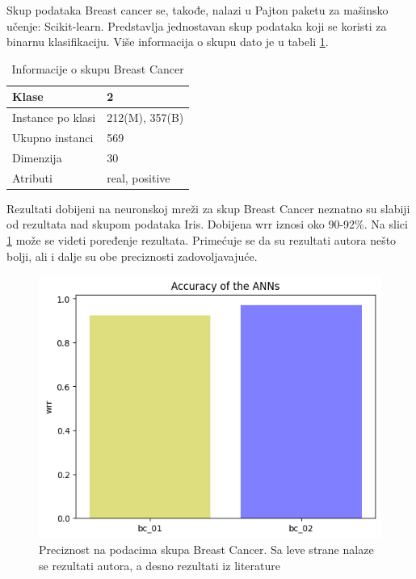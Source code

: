 \documentclass[a4paper]{article}
\begin{document}
Skup podataka Breast cancer se, takođe, nalazi u Pajton paketu za mašinsko učenje: Scikit-learn. Predstavlja jednostavan skup 
podataka koji se koristi za binarnu klasifikaciju. Više informacija o skupu dato je u tabeli \ref{table_bc}.

\begin{table}[h!]
\begin{center}
\caption{Informacije o skupu Breast Cancer}
\begin{tabular}{|p{4cm}|p{2cm}|}
\hline
Klase             & 2              \\ \hline
Instance po klasi & 212(M), 357(B) \\ \hline
Ukupno instanci   & 569            \\ \hline
Dimenzija         & 30             \\ \hline
Atributi          & real, positive \\ \hline
\end{tabular}\par
\label{table_bc}
\bigskip
\end{center} 
\end{table}

Rezultati dobijeni na neuronskoj mreži za skup Breast Cancer neznatno su slabiji od rezultata nad skupom podataka Iris.
Dobijena wrr iznosi oko 90-92\%. Na slici \ref{fig:breastslika} može se videti poređenje rezultata. Primećuje se da su 
rezultati autora \cite{hindawi} nešto bolji, ali i dalje su obe preciznosti zadovoljavajuće. 

\begin{figure}[H]
\centering
\captionsetup{justification=centering,margin=2cm}
\begin{center}
\includegraphics[scale=0.4]{img/bcwrr.png}
\end{center}
\caption{Preciznost na podacima skupa Breast Cancer. Sa leve strane nalaze se rezultati autora, a desno rezultati iz literature \cite{hindawi} }
\label{fig:breastslika}
\end{figure}
\end{document}
